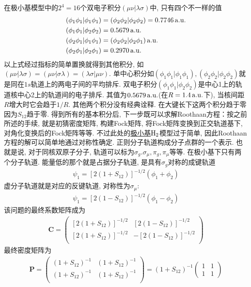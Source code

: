 在极小基模型中的$2^4=16$个双电子积分$(\mu\nu|\lambda\sigma)$中, 只有四个不一样的值
\begin{equation}
\begin{split}
(\phi_1\phi_1|\phi_1\phi_1) & = (\phi_2\phi_2|\phi_2\phi_2) = 0.7746\,\mathrm{a.u.}\\
(\phi_1\phi_1|\phi_2\phi_2) & =0.5679\,\mathrm{a.u.}\\
(\phi_2\phi_1|\phi_1\phi_1) & =(\phi_2\phi_2|\phi_2\phi_1)\,\mathrm{a.u.}\\
(\phi_2\phi_1|\phi_2\phi_1) & =0.2970\,\mathrm{a.u.}
\end{split}
\end{equation}
以上式经过指标的简单置换就得到其他积分, 如$(\mu\nu|\lambda\sigma)=(\mu\nu|\sigma\lambda)=(\lambda\sigma|\mu\nu)$. 单中心积分如$(\phi_1\phi_1|\phi_1\phi_1),(\phi_2\phi_2|\phi_2\phi_2)$就是同在$1s$轨道上的两电子间的平均排斥. 双电子积分$(\phi_1\phi_1|\phi_2\phi_2)$是中心1上的轨道核中心2上的轨道间的电子排斥. 其值为$0.5679\,\mathrm{a.u.}$(在$R=1.4\,\mathrm{a.u.}$下), 当核间距$R$增大时它会趋于$1/R$. 其他两个积分没有经典诠释. 在大键长下这两个积分趋于零因为$S_{12}$趋于零. 得到所有的基本积分后, 下一步既可以求解Roothaan方程：按之前所述的手续, 就是初猜密度矩阵, 构建Fock矩阵, 将Fock矩阵变换到正交轨道基下, 对角化变换后的Fock矩阵等等. 不过此处的\underline{极小基$\mathrm{H}_2$}模型过于简单, 因此Roothaan方程的解可以简单地通过对称性确定. 正则分子轨道构成分子点群的一个表示. 也就是说, 对于同核双原子分子, 轨道可以标为$\sigma_g.\sigma_\mu,\pi_g,\pi_\mu$等等. 在极小基下只有两个分子轨道. 能量低的那个就是占据分子轨道, 是具有$\sigma_g$对称的成键轨道
\begin{align}
\psi_1 = [2(1+S_{12})]^{-1/2}(\phi_1+\phi_2)
\end{align}
虚分子轨道就是对应的反键轨道, 对称性为$\sigma_\mu$:
\begin{align}
\psi_1 = [2(1-S_{12})]^{-1/2}(\phi_1-\phi_2)
\end{align}
该问题的最终系数矩阵成为
\begin{align}
\mathbf{C}=
\begin{pmatrix}
[2(1+S_{12})]^{-1/2} & [2(1-S_{12})]^{-1/2}\\
[2(1+S_{12})]^{-1/2} & -[2(1-S_{12})]^{-1/2}\\
\end{pmatrix}
\end{align}
最终密度矩阵为
\begin{align}
\mathbf{P}=
\begin{pmatrix}
(1+S_{12})^{-1} & (1+S_{12})^{-1} \\
(1+S_{12})^{-1} & (1+S_{12})^{-1} \\
\end{pmatrix}
=(1+S_{12})^{-1} 
\begin{pmatrix}
1&1\\1&1
\end{pmatrix}
\end{align}
